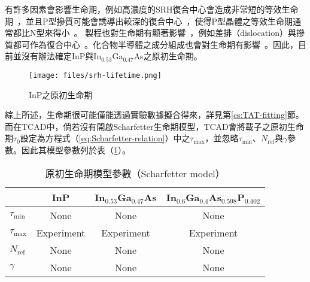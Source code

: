 有許多因素會影響生命期，例如高濃度的SRH復合中心會造成非常短的等效生命期~\cite{liu1999excess}，並且P型摻質可能會誘導出較深的復合中心~\cite{liu1999excess}，使得P型晶體之等效生命期通常都比N型來得小~\cite{liu1999excess}\cite{rosenwaks1992picosecond}。
製程也對生命期有顯著影響~\cite{yater1994minority}\cite{jenkins1991minority}，例如差排（dislocation）與摻質都可作為復合中心~\cite{yamaguchi1981electron}。化合物半導體之成分組成也會對生命期有影響~\cite{ahrenkiel1988photoluminescence}。因此，目前並沒有辦法確定InP與In$_{0.53}$Ga$_{0.47}$As之原初生命期。\\
\begin{figure}[h]
\centering
\texttt{[image: files/srh-lifetime.png]}
\caption[InP之原初生命期]{InP之原初生命期~\cite{liu1999excess}\cite{parks1996theoretical}\cite{wang2008dark}\cite{yater1994minority}\cite{xu2016extracting}}
\label{fig:srh-lifetime}
\end{figure}
\hspace{2em}綜上所述，生命期很可能僅能透過實驗數據擬合得來，詳見第\ref{cs:TAT-fitting}節。而在TCAD中，倘若沒有開啟Scharfetter生命期模型，TCAD會將載子之原初生命期$\tau_0$設定為方程式（\ref{eq:Scharfetter-relation}）中之$\tau_\text{max}$，並忽略$\tau_\text{min}$、$N_\text{ref}$與$\gamma$參數。因此其模型參數列於表（\ref{t:scharfetter-parameter}）。
\begin{table}[h]
\begin{center}
\caption[Scharfetter生命期模型參數]{原初生命期模型參數（Scharfetter model）} \label{t:scharfetter-parameter}
\begin{tabular}{lccc}

\hline
  &  InP  & In$_{0.53}$Ga$_{0.47}$As & In$_{0.6}$Ga$_{0.4}$As$_{0.598}$P$_{0.402}$  \\
\hline
$\tau_\text{min}$	& None	&	None	&	None	\\
$\tau_\text{max}$	&  Experiment	&	Experiment	&	Experiment\\
$N_\text{ref}$	&  	None	&	None	&	None	\\
$\gamma$ &	None	&	None	&	None	\\
\hline

\end{tabular}
\end{center}
\end{table}
